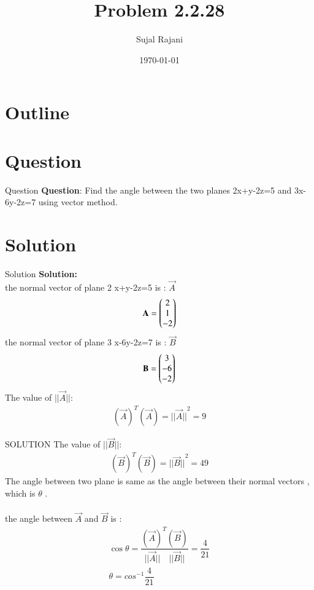 \documentclass{beamer}
\title{Problem 2.2.28}
\author{Sujal Rajani}
\date{\today}
\begin{document}
\begin{frame}
\titlepage
\end{frame}

\section*{Outline}
\begin{frame}
\tableofcontents
\end{frame}
\section{Question}
\begin{frame}{Question}
\textbf{Question}:
\noindent Find the angle between the two planes 2x+y-2z=5 and 3x-6y-2z=7 using vector method.
\end{frame}
\section{Solution}
\begin{frame}{Solution}
\textbf{Solution:} 
\\
 the   normal vector of plane 2 x+y-2z=5 is : $\vec{A}$
 \begin{align*}
     \mathbf{A}=\begin{pmatrix}2\\1\\-2\end{pmatrix}
 \end{align*}
 the normal vector of plane 3 x-6y-2z=7 is : $\vec{B}$
 \begin{align*}
     \mathbf{B}=\begin{pmatrix}3\\-6\\-2\end{pmatrix}
 \end{align*} 
 The value of $||\vec{A}||$:
  \begin{align*}
     (\vec{A})^T(\vec{A})={||\vec{A}||}^2=9
 \end{align*}
 \end{frame} 
 
 \begin{frame}{SOLUTION}
 The value of $||\vec{B}||$:
  \begin{align*}
     (\vec{B })^T(\vec{B})={||\vec{B}||}^2=49
 \end{align*}
 The angle between two plane is same as the angle between their normal vectors , which is  $\theta$ .
\\
\\
 the angle between $\vec{A}$ and $\vec{B}$ is :
 \begin{align*}
      \cos{\theta} = \dfrac{(\vec{A})^T(\vec{B})}{||\vec{A}||\quad||\vec{B}||}=\dfrac{4}{21}
       \\
      \theta=cos^{-1}\dfrac{4}{21}
 \end{align*}
 \end{frame}
\end{document}
